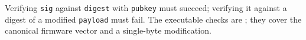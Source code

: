Verifying \texttt{sig} against \texttt{digest} with \texttt{pubkey} must
succeed; verifying it against a digest of a modified \texttt{payload} must
fail. The executable checks are
; they cover the canonical
firmware vector and a single-byte modification.

